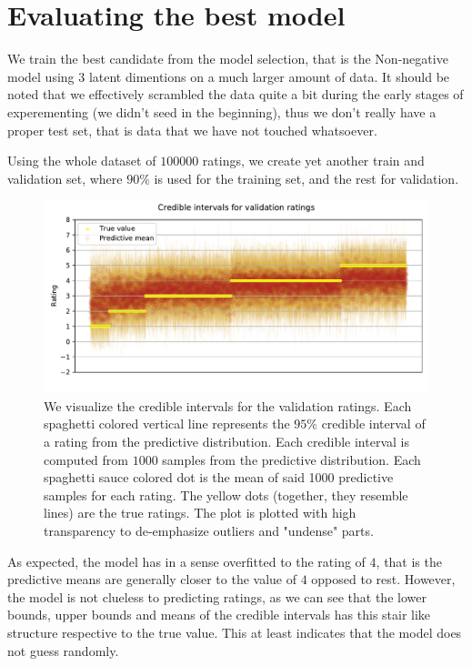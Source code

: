 \documentclass[12pt]{article}
\begin{document}
\section{Evaluating the best model}
We train the best candidate from the model selection, that is the Non-negative model using $3$ latent dimentions on a much larger amount of data. It should be noted that we effectively scrambled the data quite a bit during the early stages of experementing (we didn't seed in the beginning), thus we don't really have a proper test set, that is data that we have not touched whatsoever.

\vspace{5mm}
Using the whole dataset of $100000$ ratings, we create yet another train and validation set, where $90\%$ is used for the training set, and the rest for validation.

\begin{figure}[H]
    \centering
    \caption{We visualize the credible intervals for the validation ratings. Each spaghetti colored vertical line represents the $95\%$ credible interval of a rating from the predictive distribution. Each credible interval is computed from $1000$ samples from the predictive distribution. Each spaghetti sauce colored dot is the mean of said 1000 predictive samples for each rating. The yellow dots (together, they resemble lines) are the true ratings. The plot is plotted with high transparency to de-emphasize outliers and "undense" parts.}
    \label{fig:credibles}
    \includegraphics[width=\textwidth]{credibles.pdf}
\end{figure}
As expected, the model has in a sense overfitted to the rating of $4$, that is the predictive means are generally closer to the value of $4$ opposed to rest. However, the model is not clueless to predicting ratings, as we can see that the lower bounds, upper bounds and means of the credible intervals has this stair like structure respective to the true value. This at least indicates that the model does not guess randomly.
\end{document}
